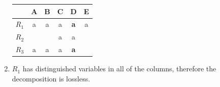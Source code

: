\documentclass[10pt,a4paper,answers]{exam}
\newcounter{sol}
\begin{document}
\begin{questions}
\begin{parts}
\begin{solution}
\begin{enumerate}
\begin{center}
\begin{tabular}{|c|c|c|c|c|c|}
					\hline
					\rowcolor[HTML]{EFEFEF} 
					& \textbf{A} & \textbf{B} & \textbf{C} & \textbf{D} & \textbf{E} \\ \hline
					$R_1$ & a          &     a      &      a      &     \textbf{a}       & a          \\ \hline
					$R_2$ &            &            & a          & a          &            \\ \hline
					$R_3$ & a          & a          & a          &       \textbf{a}       &            \\ \hline
				\end{tabular}
			\end{center}
		
			\item $R_1$ has distinguished variables in all of the columns, therefore the decomposition is lossless.
			\end{enumerate}
	\end{solution}
\end{parts}


\end{questions}
\end{document}
